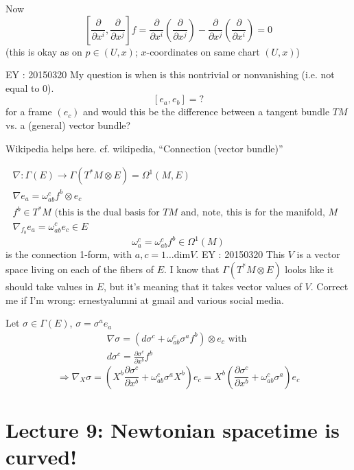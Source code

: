 \documentclass[10pt]{amsart}
\begin{document}
\begin{multicols*}{2}
	Now
	\[
	\left[ \frac{ \partial }{ \partial x^i} , \frac{ \partial }{ \partial x^j} \right] f = \frac{ \partial }{ \partial x^i } \left( \frac{ \partial }{ \partial x^j} \right) - \frac{ \partial }{ \partial x^j } \left( \frac{ \partial }{ \partial x^i} \right) = 0 
	\]
	(this is okay as on $p \in (U,x)$; $x$-coordinates on same chart $(U,x)$)
	
	EY : 20150320 My question is when is this nontrivial or nonvanishing (i.e. not equal to $0$).
	\[
	[e_a,e_b] = ?
	\]
	for a frame $(e_c)$ and would this be the difference between a tangent bundle $TM$ vs. a (general) vector bundle?
	
	Wikipedia helps here. cf. wikipedia, ``Connection (vector bundle)''
	
	\[
	\begin{gathered}
	\nabla : \Gamma(E) \to \Gamma(T^*M \otimes E) = \Omega^1(M,E) \\
	\nabla e_a = \omega^c_{ab} f^b \otimes e_c \\ 
	f^b \in T^*M \text{ (this is the dual basis for $TM$ and, note, this is for the manifold, $M$ } \\
	\nabla_{f_b}e_a = \omega^c_{ab} e_c \in E
	\end{gathered}
	\]
	\[
	\omega^c_a  = \omega^c_{ab} f^b \in \Omega^1(M)
	\]
	is the connection 1-form, with $a,c = 1 \dots \text{dim}V$.  EY : 20150320 This $V$ is a vector space living on each of the fibers of $E$.   I know that $\Gamma(T^*M \otimes E)$ looks like it should take values in $E$, but it's meaning that it takes vector values of $V$.  Correct me if I'm wrong: ernestyalumni at gmail and various social media.
	
	Let $\sigma \in \Gamma(E)$, $\sigma = \sigma^ae_a$  
	\[
	\begin{gathered}
	\nabla \sigma = (d\sigma^c + \omega^c_{ab} \sigma^a f^b) \otimes e_c \text{ with } \\ 
	d\sigma^c = \frac{ \partial \sigma^c}{ \partial x^b } f^b 
	\end{gathered}
	\]
	\[
	\Longrightarrow \nabla_X \sigma = \left( X^b \frac{ \partial \sigma^c}{ \partial x^b} + \omega^c_{ab} \sigma^a X^b \right)e_c = X^b \left( \frac{ \partial \sigma^c}{ \partial x^b } + \omega^c_{ab} \sigma^a \right)e_c
	\]
	
	
	\section*{Lecture 9: Newtonian spacetime is curved!}
	

\end{multicols*}
\end{document}
